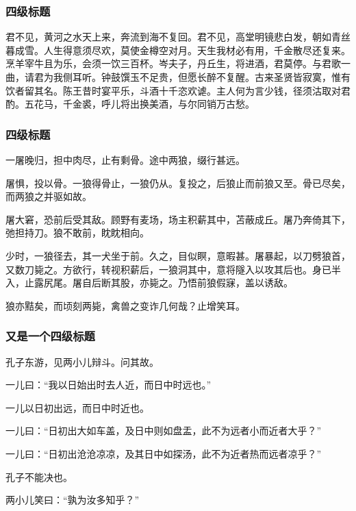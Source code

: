             \subsubsection{四级标题}
                
            君不见，黄河之水天上来，奔流到海不复回。君不见，高堂明镜悲白发，朝如青丝暮成雪。人生得意须尽欢，莫使金樽空对月。天生我材必有用，千金散尽还复来。烹羊宰牛且为乐，会须一饮三百杯。岑夫子，丹丘生，将进酒，君莫停。与君歌一曲，请君为我侧耳听。钟鼓馔玉不足贵，但愿长醉不复醒。古来圣贤皆寂寞，惟有饮者留其名。陈王昔时宴平乐，斗酒十千恣欢谑。主人何为言少钱，径须沽取对君酌。五花马，千金裘，呼儿将出换美酒，与尔同销万古愁。

            \subsubsection{四级标题}

                一屠晚归，担中肉尽，止有剩骨。途中两狼，缀行甚远。

                屠惧，投以骨。一狼得骨止，一狼仍从。复投之，后狼止而前狼又至。骨已尽矣，而两狼之并驱如故。

                屠大窘，恐前后受其敌。顾野有麦场，场主积薪其中，苫蔽成丘。屠乃奔倚其下，弛担持刀。狼不敢前，眈眈相向。

                少时，一狼径去，其一犬坐于前。久之，目似瞑，意暇甚。屠暴起，以刀劈狼首，又数刀毙之。方欲行，转视积薪后，一狼洞其中，意将隧入以攻其后也。身已半入，止露尻尾。屠自后断其股，亦毙之。乃悟前狼假寐，盖以诱敌。

                狼亦黠矣，而顷刻两毙，禽兽之变诈几何哉？止增笑耳。

            \subsubsection{又是一个四级标题}

                孔子东游，见两小儿辩斗。问其故。

                一儿曰：“我以日始出时去人近，而日中时远也。”

                一儿以日初出远，而日中时近也。

                一儿曰：“日初出大如车盖，及日中则如盘盂，此不为远者小而近者大乎？”

                一儿曰：“日初出沧沧凉凉，及其日中如探汤，此不为近者热而远者凉乎？”

                孔子不能决也。

                两小儿笑曰：“孰为汝多知乎？”

